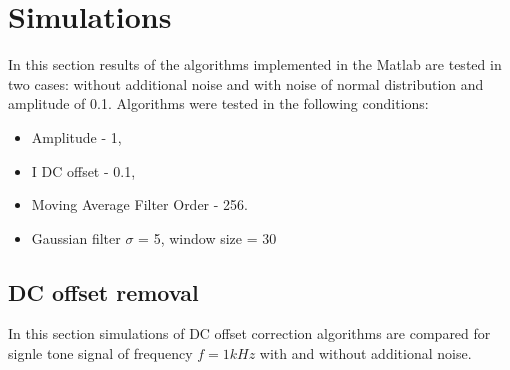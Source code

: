 \documentclass[en,printmode]{mgr}
\begin{document}
	\section{Simulations}
		In this section results of the algorithms implemented in the Matlab are
		tested in two cases: without additional noise and with noise of normal distribution and 
		amplitude of 0.1.
		Algorithms were tested in the following conditions:
		\begin{itemize}
			\item Amplitude - 1,
			\item I DC offset - 0.1,
			\item Moving Average Filter Order - 256.
			\item Gaussian filter $\sigma$ = 5, window size = 30
		\end{itemize}
		\subsection*{DC offset removal}
		In this section simulations of DC offset correction algorithms are compared for signle tone
		signal of frequency $f=1kHz$ with and without additional noise.
\end{document}
